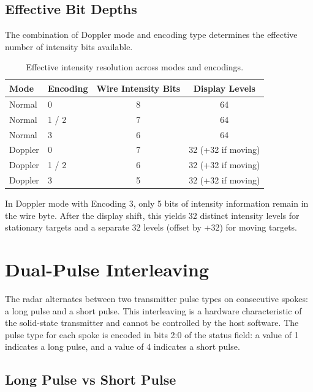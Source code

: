 \documentclass[11pt,letterpaper]{article}
\begin{document}
\subsection{Effective Bit Depths}

The combination of Doppler mode and encoding type determines the effective number of intensity bits available.

\begin{table}[H]
\centering
\caption{Effective intensity resolution across modes and encodings.}
\label{tab:bitdepth}
\begin{tabular}{@{}llcc@{}}
\toprule
\textbf{Mode} & \textbf{Encoding} & \textbf{Wire Intensity Bits} & \textbf{Display Levels} \\
\midrule
Normal  & 0       & 8 & 64 \\
Normal  & 1 / 2   & 7 & 64 \\
Normal  & 3       & 6 & 64 \\
Doppler & 0       & 7 & 32 (+32 if moving) \\
Doppler & 1 / 2   & 6 & 32 (+32 if moving) \\
Doppler & 3       & 5 & 32 (+32 if moving) \\
\bottomrule
\end{tabular}
\end{table}

In Doppler mode with Encoding 3, only 5 bits of intensity information remain in the wire byte. After the display shift, this yields 32 distinct intensity levels for stationary targets and a separate 32 levels (offset by +32) for moving targets.


\section{Dual-Pulse Interleaving}
\label{sec:dualpulse}

The radar alternates between two transmitter pulse types on consecutive spokes: a long pulse and a short pulse. This interleaving is a hardware characteristic of the solid-state transmitter and cannot be controlled by the host software. The pulse type for each spoke is encoded in bits 2:0 of the status field: a value of 1 indicates a long pulse, and a value of 4 indicates a short pulse.

\subsection{Long Pulse vs Short Pulse}
\end{document}

